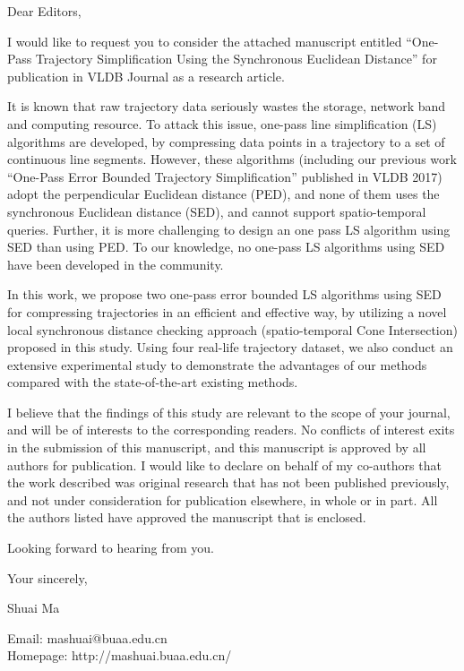\documentclass{letter}
\begin{document}
Dear Editors,

I would like to request you to consider the attached manuscript entitled ``One-Pass Trajectory Simplification Using the Synchronous Euclidean Distance'' for publication in VLDB Journal as a research article.
 
It is known that raw trajectory data seriously wastes the storage, network band and computing resource. To attack this issue, one-pass line simplification (LS) algorithms are developed, by compressing data points in a trajectory to a set of continuous line segments.  However, these algorithms (including our previous work ``One-Pass Error Bounded Trajectory Simplification'' published in VLDB 2017) adopt the perpendicular Euclidean distance (PED), and none of them uses the synchronous Euclidean distance (SED), and cannot support spatio-temporal queries.  Further, it is more challenging to design an one pass LS algorithm using SED than using PED. To our knowledge, no one-pass LS algorithms using SED have been developed in the community.

In this work, we propose two one-pass error bounded LS algorithms using SED for compressing trajectories in an efficient and effective way, by utilizing a novel local synchronous distance checking approach (spatio-temporal Cone Intersection) proposed in this study.  Using four real-life trajectory dataset, we also conduct an
extensive experimental study to demonstrate the advantages of our methods compared with the state-of-the-art existing methods.


I believe that the findings of this study are relevant to the scope of your journal, and will be of interests to the corresponding readers.
No conflicts of interest exits in the submission of this manuscript, and this manuscript is approved by all authors for publication. I would like to declare on behalf of my co-authors that the work described was original research that has not been published previously, and not under consideration for publication elsewhere, in whole or in part. All the authors listed have approved the manuscript that is enclosed.



Looking forward to hearing from you.


Your sincerely,

Shuai Ma


Email: mashuai@buaa.edu.cn\\
Homepage: http://mashuai.buaa.edu.cn/
\end{document}
